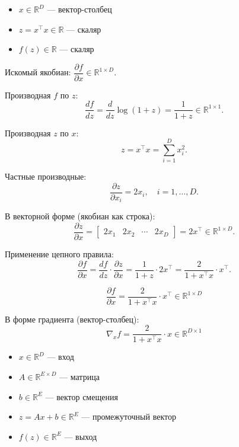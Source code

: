 \documentclass[pract]{SCWorks}
\begin{document}
    \begin{itemize}
        \item[$\bullet$] $x \in \mathbb{R}^D$ — вектор-столбец
        \item[$\bullet$] $z = x^\top x \in \mathbb{R}$ — скаляр
        \item[$\bullet$] $f(z) \in \mathbb{R}$ — скаляр
    \end{itemize}

    Искомый якобиан: $\dfrac{\partial f}{\partial x} \in \mathbb{R}^{1 \times D}$.

    Производная $f$ по $z$:
    \[
    \frac{df}{dz} = \frac{d}{dz} \log(1 + z) = \frac{1}{1 + z} \in \mathbb{R}^{1 \times 1}.
    \]

    Производная $z$ по $x$:
    \[
    z = x^\top x = \sum_{i=1}^D x_i^2.
    \]

    Частные производные:
    \[
    \frac{\partial z}{\partial x_i} = 2x_i, \quad i = 1, \dots, D.
    \]

    В векторной форме (якобиан как строка):
    \[
    \frac{\partial z}{\partial x} = \begin{bmatrix}
    2x_1 & 2x_2 & \cdots & 2x_D
    \end{bmatrix} = 2x^\top \in \mathbb{R}^{1 \times D}.
    \]

    Применение цепного правила:
    \[
    \frac{\partial f}{\partial x} = \frac{df}{dz} \cdot \frac{\partial z}{\partial x}
    = \frac{1}{1 + z} \cdot 2x^\top
    = \frac{2}{1 + x^\top x} \cdot x^\top.
    \]

    \[
    \boxed{\frac{\partial f}{\partial x} = \frac{2}{1 + x^\top x} \cdot x^\top \in \mathbb{R}^{1 \times D}}
    \]

    В форме градиента (вектор-столбец):
    \[
    \boxed{\nabla_x f = \frac{2}{1 + x^\top x} \cdot x \in \mathbb{R}^{D \times 1}}
    \]

    \begin{itemize}
        \item[$\bullet$] $x \in \mathbb{R}^D$ — вход
        \item[$\bullet$] $A \in \mathbb{R}^{E \times D}$ — матрица
        \item[$\bullet$] $b \in \mathbb{R}^E$ — вектор смещения
        \item[$\bullet$] $z = Ax + b \in \mathbb{R}^E$ — промежуточный вектор
        \item[$\bullet$] $f(z) \in \mathbb{R}^E$ — выход
    \end{itemize}
\end{document}
